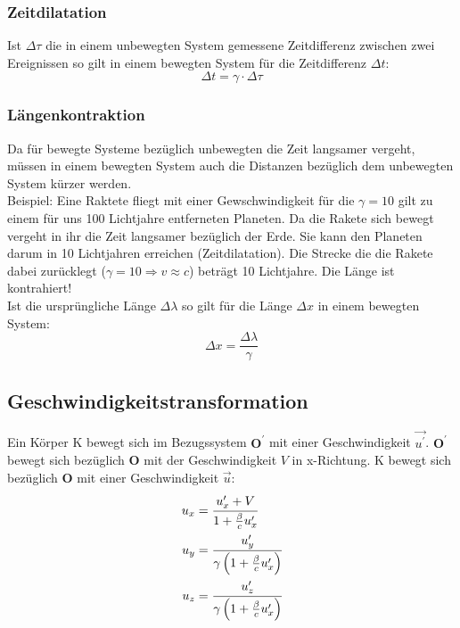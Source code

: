 \subsubsection{Zeitdilatation}
Ist $\Delta \tau $ die in einem unbewegten System gemessene Zeitdifferenz zwischen zwei Ereignissen so gilt in einem bewegten System für die Zeitdifferenz $\Delta t$:
\begin{equation}
\Delta t = \gamma \cdot \Delta \tau
\end{equation}
\subsubsection{Längenkontraktion}
Da für bewegte Systeme bezüglich unbewegten die Zeit langsamer vergeht, müssen in einem bewegten System auch die Distanzen bezüglich dem unbewegten System kürzer werden. \\
Beispiel: Eine Raktete fliegt mit einer Gewschwindigkeit für die $\gamma = 10$ gilt zu einem für uns 100 Lichtjahre entferneten Planeten. Da die Rakete sich bewegt vergeht in ihr die Zeit langsamer bezüglich der Erde. Sie kann den Planeten darum in 10 Lichtjahren erreichen (Zeitdilatation). Die Strecke die die Rakete dabei zurücklegt ($\gamma = 10 \Rightarrow v \approx c$) beträgt 10 Lichtjahre. Die Länge ist kontrahiert! \\
Ist die ursprüngliche Länge $\Delta \lambda$ so gilt für die Länge $\Delta x$ in einem bewegten System:
\begin{equation}
\Delta x = \dfrac{\Delta \lambda}{\gamma}
\end{equation}
\subsection{Geschwindigkeitstransformation}
Ein Körper K bewegt sich im Bezugssystem $\mathbf{O^\prime}$ mit einer Geschwindigkeit $\vec{u^\prime}$. $\mathbf{O^\prime}$ bewegt sich bezüglich $\mathbf{O}$ mit der Geschwindigkeit $V$ in x-Richtung. K bewegt sich bezüglich $\mathbf{O}$ mit einer Geschwindigkeit $\vec{u}$:
\begin{align}
u_x &= \cfrac{u_x^\prime + V}{1 + \frac{\beta}{c} u_x^\prime} \\
u_y &= \cfrac{u_y^\prime}{\gamma \left( 1 + \frac{\beta}{c}u_x^\prime \right)} \\
u_z &= \cfrac{u_z^\prime}{\gamma \left( 1 + \frac{\beta}{c}u_x^\prime \right)}
\end{align}